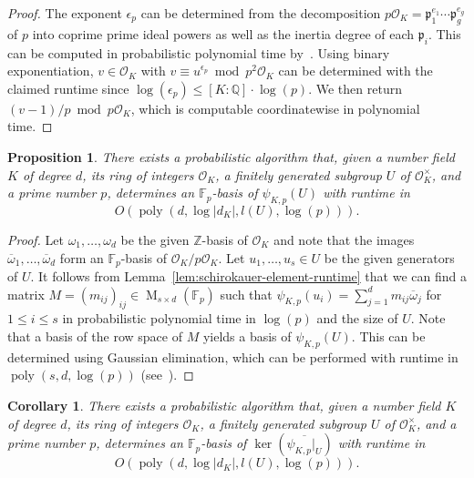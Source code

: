 \documentclass[12pt, a4paper, usenames]{amsart}
\newcommand{\Z}{\mathbb{Z}}
\newcommand{\Q}{\mathbb{Q}}
\newcommand{\F}{\mathbb{F}}
\theoremstyle{plain}
\newtheorem{corollary}[theorem]{Corollary}
\newtheorem{prop}[theorem]{Proposition}
\theoremstyle{remark}
\theoremstyle{definition}
\DeclareMathOperator{\poly}{poly}
\begin{document}
\begin{proof}
The exponent $\epsilon_{p}$ can be determined from the decomposition $p\mathcal{O}_{K} = \mathfrak{p}_{1}^{e_1} \dotsm \mathfrak{p}_{g}^{e_g}$ of $p$ into coprime prime ideal powers 
as well as the inertia degree of each $\mathfrak{p}_{i}$.
This can be computed in probabilistic polynomial time by~\cite[Theorem~4.9]{MR1129315}.
Using binary exponentiation, $v \in \mathcal{O}_{K}$ with 
$v \equiv u^{\epsilon_{p}} \bmod p^{2} \mathcal{O}_{K}$ can be determined
with the claimed runtime since $\log(\epsilon_{p}) \leq [K:\Q] \cdot \log(p)$.
We then return $(v - 1)/p \bmod p\mathcal{O}_{K}$, which is computable coordinatewise in polynomial time.
\end{proof}

\begin{prop}\label{prop:alg-schiro-image}
There exists a probabilistic algorithm that, given a number field $K$ of degree $d$, its ring of integers $\mathcal{O}_{K}$, 
a finitely generated subgroup $U$ of $\mathcal{O}_{K}^{\times}$, and a prime number $p$,
determines an $\F_{p}$-basis of $\psi_{K,p}(U)$ with runtime in
\[ 
O(\poly(d, \log \lvert  d_K \rvert, l(U), \log(p))). 
\] 
\end{prop}

\begin{proof}
Let $\omega_1,\dotsc,\omega_d$ be the given $\Z$-basis of $\mathcal{O}_{K}$
and note that the images $\overline \omega_1,\dotsc,\overline \omega_d$ 
form an $\F_{p}$-basis of $\mathcal{O}_{K}/p\mathcal{O}_{K}$.
Let $u_{1},\dotsc,u_{s} \in U$ be the given generators of $U$.
It follows from Lemma~\ref{lem:schirokauer-element-runtime} that we can find a matrix $M = (m_{ij})_{ij} \in \operatorname{M}_{s \times d}(\F_{p})$ such that $\psi_{K,p}(u_{i}) = \sum_{j=1}^{d} m_{ij} \overline{\omega}_j$ for $1 \leq i \leq s$ in probabilistic polynomial time in $\log(p)$ and the size of $U$.
Note that a basis of the row space of $M$ yields a basis of $\psi_{K, p}(U)$.
This can be determined using Gaussian elimination, which can be performed with runtime 
in $\poly(s,d,\log(p))$ (see~\cite[Chapter~2]{storjohann}).
\end{proof}

\begin{corollary}\label{cor:alg-schiro-kernel}
There exists a probabilistic algorithm that, given a number field $K$ of degree $d$, its ring of integers $\mathcal{O}_{K}$, 
a finitely generated subgroup $U$ of $\mathcal{O}_{K}^{\times}$, and a prime number $p$,
determines an $\F_p$-basis of $\ker(\overline{\psi_{K,p}|_U})$ with runtime in
\[ 
O(\poly(d, \log \lvert  d_K \rvert, l(U), \log(p))). 
\]     
\end{corollary}
\end{document}
